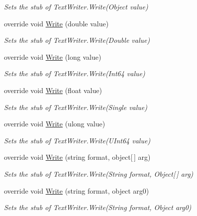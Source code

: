 \begin{DoxyCompactItemize}
\begin{DoxyCompactList}\small\item\em Sets the stub of Text\-Writer.\-Write(\-Object value)\end{DoxyCompactList}\item 
override void \hyperlink{class_system_1_1_i_o_1_1_fakes_1_1_stub_text_writer_a43397baa8c0cde6cd20d86da3e19f3e0}{Write} (double value)
\begin{DoxyCompactList}\small\item\em Sets the stub of Text\-Writer.\-Write(\-Double value)\end{DoxyCompactList}\item 
override void \hyperlink{class_system_1_1_i_o_1_1_fakes_1_1_stub_text_writer_af221ff51eb1d4f0e45d67df73314ac92}{Write} (long value)
\begin{DoxyCompactList}\small\item\em Sets the stub of Text\-Writer.\-Write(\-Int64 value)\end{DoxyCompactList}\item 
override void \hyperlink{class_system_1_1_i_o_1_1_fakes_1_1_stub_text_writer_a52c2581f69aea050afb0be02bcd9e14e}{Write} (float value)
\begin{DoxyCompactList}\small\item\em Sets the stub of Text\-Writer.\-Write(\-Single value)\end{DoxyCompactList}\item 
override void \hyperlink{class_system_1_1_i_o_1_1_fakes_1_1_stub_text_writer_a2ccd11ca2f1aeb198efeddc76d68e8c7}{Write} (ulong value)
\begin{DoxyCompactList}\small\item\em Sets the stub of Text\-Writer.\-Write(\-U\-Int64 value)\end{DoxyCompactList}\item 
override void \hyperlink{class_system_1_1_i_o_1_1_fakes_1_1_stub_text_writer_a31a9e77b6f1246f7a86ba6fbf4da28fd}{Write} (string format, object\mbox{[}$\,$\mbox{]} arg)
\begin{DoxyCompactList}\small\item\em Sets the stub of Text\-Writer.\-Write(\-String format, Object\mbox{[}$\,$\mbox{]} arg)\end{DoxyCompactList}\item 
override void \hyperlink{class_system_1_1_i_o_1_1_fakes_1_1_stub_text_writer_a54853660d7510699c6587989c32f5b7b}{Write} (string format, object arg0)
\begin{DoxyCompactList}\small\item\em Sets the stub of Text\-Writer.\-Write(\-String format, Object arg0)\end{DoxyCompactList}\item 

\end{DoxyCompactItemize}
